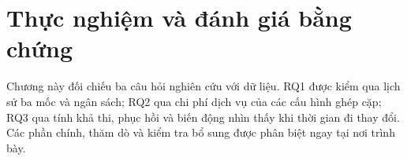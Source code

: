 \chapter{Thực nghiệm và đánh giá bằng chứng}
\label{ch:thucnghiem}

Chương này đối chiếu ba câu hỏi nghiên cứu với dữ liệu. RQ1 được kiểm qua lịch sử ba mốc
và ngân sách; RQ2 qua chi phí dịch vụ của các cấu hình ghép cặp; RQ3 qua tính khả thi,
phục hồi và biến động nhìn thấy khi thời gian đi thay đổi. Các phần chính, thăm dò và kiểm
tra bổ sung được phân biệt ngay tại nơi trình bày.







